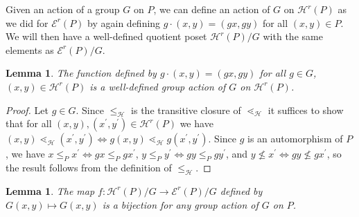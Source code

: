 \documentclass[10 pt]{amsart}
\theoremstyle{plain}
\newtheorem{lem}[thm]{Lemma}
\theoremstyle{definition}
\theoremstyle{remark}
\numberwithin{equation}{section}
\renewcommand{\iff}{\Leftrightarrow}
\begin{document}
Given an action of a group $G$ on $P$, we can define an action of $G$ on $\mathcal{H}^r(P)$ as we did for $\mathcal{E}^r(P)$ by again defining $g\cdot (x,y) = (gx,gy)$ for all $(x,y)\in P$.  We will then have a well-defined quotient poset $\mathcal{H}^r(P)/G$ with the same elements as $\mathcal{E}^r(P)/G$.


\begin{lem}
\label{lem:G_action_on_HP}
The function defined by $g\cdot (x, y)= (gx, gy)$ for all $g\in G$, $(x, y)\in \mathcal{H}^r(P)$ is a well-defined group action of $G$ on $\mathcal{H}^r(P)$.
\end{lem}

\begin{proof}
Let $g\in G$.  Since $\le_{\mathcal{H}}$ is the transitive closure of $\lessdot_{\mathcal{H}}$ it suffices to show that for all $(x,y),(x^\prime,y^\prime)\in \mathcal{H}^r(P)$ we have $(x, y) \lessdot_{\mathcal H} (x^\prime,y^\prime) \iff g(x, y) \lessdot_{\mathcal H} g(x^\prime, y^\prime)$.  Since $g$ is an automorphism of $P$, we have $x\le_P x^\prime \iff gx\le_P gx^\prime$, $y\le_P y^\prime \iff gy\le_P gy^\prime$, and $y\not\le x^\prime \iff gy\not\le gx^\prime$, so the result follows from the definition of $\le_{\mathcal{H}}$.



\end{proof}

\begin{lem}
\label{lem:bijection_h_f}
The map $f:\mathcal H^r(P)/G \rightarrow \mathcal E^r(P)/G$ defined by $G(x,y) \mapsto G(x,y)$ is a bijection for any group action of $G$ on $P$.
\end{lem}
\end{document}
